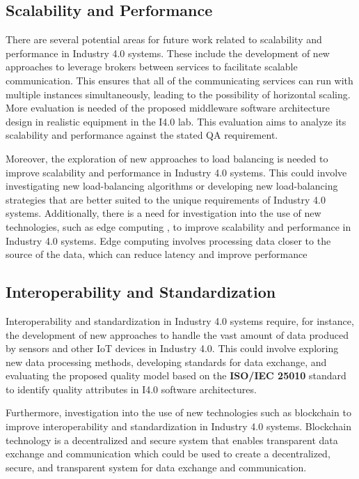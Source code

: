 \documentclass[conference]{IEEEtran}
\begin{document}
\subsection{Scalability and Performance}
There are several potential areas for future work related to scalability and performance in Industry 4.0 systems. These include the development of new approaches to leverage brokers between services to facilitate scalable communication. This ensures that all of the communicating services can run with multiple instances simultaneously, leading to the possibility of horizontal scaling. More evaluation is needed of the proposed middleware software architecture design in realistic equipment in the I4.0 lab. This evaluation aims to analyze its scalability and performance against the stated QA requirement.

Moreover, the exploration of new approaches to load balancing is needed to improve scalability and performance in Industry 4.0 systems. This could involve investigating new load-balancing algorithms or developing new load-balancing strategies that are better suited to the unique requirements of Industry 4.0 systems. Additionally, there is a need for investigation into the use of new technologies, such as edge computing \cite{edge-and-fog}, to improve scalability and performance in Industry 4.0 systems. Edge computing involves processing data closer to the source of the data, which can reduce latency and improve performance 

\subsection{Interoperability and Standardization}
Interoperability and standardization in Industry 4.0 systems require, for instance, the development of new approaches to handle the vast amount of data produced by sensors and other IoT devices in Industry 4.0. This could involve exploring new data processing methods, developing standards for data exchange, and evaluating the proposed quality model based on the \textbf{ISO/IEC 25010} standard to identify quality attributes \cite{ANTONINO2022101801} in I4.0 software architectures.

Furthermore, investigation into the use of new technologies such as blockchain to improve interoperability and standardization in Industry 4.0 systems. Blockchain technology \cite{9069885} is a decentralized and secure system that enables transparent data exchange and communication which could be used to create a decentralized, secure, and transparent system for data exchange and communication.
\end{document}
